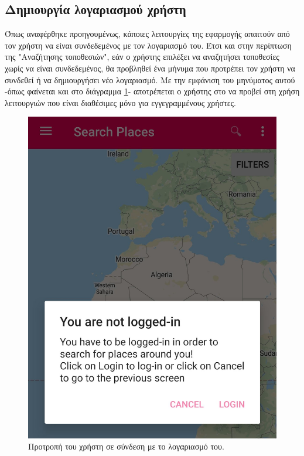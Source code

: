 \documentclass[oneside, 12pt]{book}
\begin{document}
\subsection{Δημιουργία λογαριασμού χρήστη}
Όπως αναφέρθηκε προηγουμένως, κάποιες λειτουργίες της εφαρμογής 
απαιτούν από τον χρήστη να είναι συνδεδεμένος με τον λογαριασμό του. 
Έτσι και στην περίπτωση της "Αναζήτησης τοποθεσιών", εάν ο χρήστης 
επιλέξει να αναζητήσει τοποθεσίες χωρίς να είναι συνδεδεμένος, θα 
προβληθεί ένα μήνυμα που προτρέπει τον χρήστη να συνδεθεί ή να 
δημιουργήσει νέο λογαριασμό. Με την εμφάνιση του μηνύματος αυτού -όπως φαίνεται και στο διάγραμμα \ref{fig:login_prompt}- αποτρέπεται ο χρήστης στο να προβεί στη χρήση λειτουργιών που είναι διαθέσιμες μόνο για εγγεγραμμένους χρήστες.
\begin{figure}[h]
  \centering
  \includegraphics[scale=0.15]{images/login_prompt.jpg}
  \caption{\label{fig:login_prompt}Προτροπή του χρήστη σε σύνδεση με το λογαριασμό του.}
\end{figure}
\end{document}
